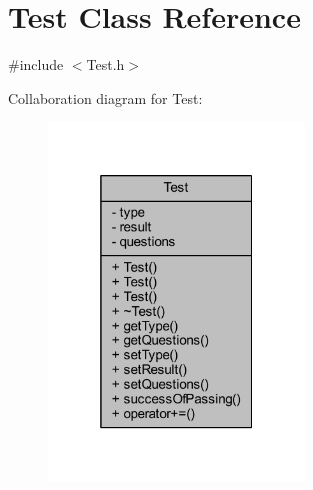 \hypertarget{class_test}{}\section{Test Class Reference}
\label{class_test}


{\ttfamily \#include $<$Test.\+h$>$}



Collaboration diagram for Test\+:
\nopagebreak
\begin{figure}[H]
\begin{center}
\leavevmode
\includegraphics[width=193pt]{class_test__coll__graph}
\end{center}
\end{figure}
